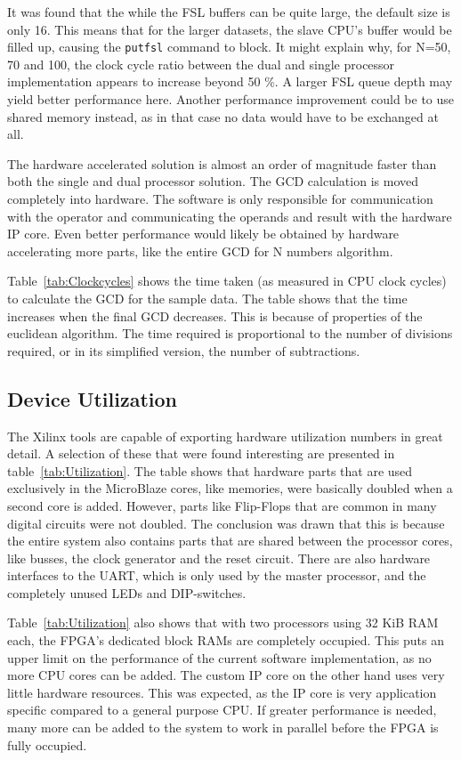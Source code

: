 \documentclass[11pt]{article}
\begin{document}
It was found that the while the FSL buffers can be quite large, the default size is only 16\cite{fsl}. This means that for the larger datasets, the slave CPU's buffer would be filled up, causing the \texttt{putfsl} command to block. It might explain why, for N=50, 70 and 100, the clock cycle ratio between the dual and single processor implementation appears to increase beyond 50 \%. A larger FSL queue depth may yield better performance here. Another performance improvement could be to use shared memory instead, as in that case no data would have to be exchanged at all.

The hardware accelerated solution is almost an order of magnitude faster than both the single and dual processor solution. The GCD calculation is moved completely into hardware. The software is only responsible for communication with the operator and communicating the operands and result with the hardware IP core. Even better performance would likely be obtained by hardware accelerating more parts, like the entire GCD for N numbers algorithm.

Table~\ref{tab:Clockcycles} shows the time taken (as measured in CPU clock cycles) to calculate the GCD for the sample data\cite{assignments}. The table shows that the time increases when the final GCD decreases. This is because of properties of the euclidean algorithm. The time required is proportional to the number of divisions required, or in its simplified version, the number of subtractions.

\subsection{Device Utilization}
The Xilinx tools are capable of exporting hardware utilization numbers in great detail. A selection of these that were found interesting are presented in table~\ref{tab:Utilization}. The table shows that hardware parts that are used exclusively in the MicroBlaze cores, like memories, were basically doubled when a second core is added. However, parts like Flip-Flops that are common in many digital circuits were not doubled. The conclusion was drawn that this is because the entire system also contains parts that are shared between the processor cores, like busses, the clock generator and the reset circuit. There are also hardware interfaces to the UART, which is only used by the master processor, and the completely unused LEDs and DIP-switches.

Table~\ref{tab:Utilization} also shows that with two processors using 32 KiB RAM each, the FPGA's dedicated block RAMs are completely occupied. This puts an upper limit on the performance of the current software implementation, as no more CPU cores can be added. The custom IP core on the other hand uses very little hardware resources. This was expected, as the IP core is very application specific compared to a general purpose CPU. If greater performance is needed, many more can be added to the system to work in parallel before the FPGA is fully occupied.
\end{document}
